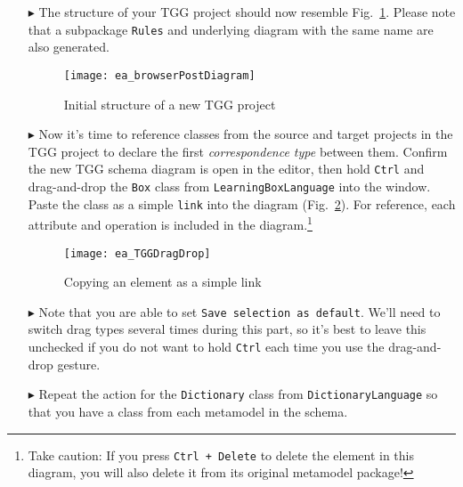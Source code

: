 \begin{itemize}
\item[$\blacktriangleright$] The structure of your TGG project should now resemble Fig.~\ref{ea:new_tgg_project}. Please note that a subpackage \texttt{Rules}
and underlying diagram with the same name are also generated.

\begin{figure}[htbp]
\begin{center}
  \texttt{[image: ea\_browserPostDiagram]}
  \caption{Initial structure of a new TGG project}  
  \label{ea:new_tgg_project}
\end{center}
\end{figure}
\end{itemize}
\clearpage

\begin{itemize}

\item[$\blacktriangleright$] Now it's time to reference classes from the source and target projects in the TGG project to declare the first \emph{correspondence
type} between them. Confirm the new TGG schema diagram is open in the editor,
then hold \texttt{Ctrl} and drag-and-drop the \texttt{Box} class from \texttt{Learning\-Box\-Language} into the window. Paste the class as a simple \texttt{link} into the diagram (Fig.~\ref{ea:TGGdragDrop}). For reference, each
attribute and operation is included in the diagram.\footnote{Take caution: If you press \texttt{Ctrl + Delete} to delete the element in this diagram,
you will also delete it from its original metamodel package!}

\vspace{0.5cm}

\begin{figure}[htbp]
\begin{center}
  \texttt{[image: ea\_TGGDragDrop]}
  \caption{Copying an element as a simple link} 
  \label{ea:TGGdragDrop}
\end{center}
\end{figure}

\item[$\blacktriangleright$] Note that you are able to set \texttt{Save selection as default}. We'll need to switch drag types several times during this
part, so it's best to leave this unchecked if you do not want to hold
\texttt{Ctrl} each time you use the drag-and-drop gesture.
 
\vspace{0.5cm}

\item[$\blacktriangleright$] Repeat the action for the \texttt{Dictionary} class from \texttt{DictionaryLanguage} so that you have a class from each metamodel in the
schema.


\end{itemize}
